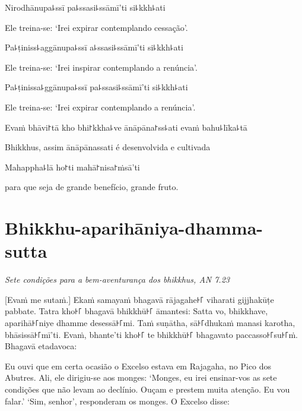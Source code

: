 Nirodhānupa꜕ssī pa꜕ssasi꜕ssāmī'ti si꜕kkh꜕ati

\begin{english}
  Ele treina-se: `Irei expirar contemplando cessação'.
\end{english}

Pa꜕ṭiniss꜕aggānupa꜕ssī a꜕ssasi꜕ssāmī'ti si꜕kkh꜕ati

\begin{english}
  Ele treina-se: `Irei inspirar contemplando a renúncia'.
\end{english}

Pa꜕ṭinissa꜕ggānupa꜕ssī pa꜕ssasi꜕ssāmī'ti si꜕kkh꜕ati

\begin{english}
  Ele treina-se: `Irei expirar contemplando a renúncia'.
\end{english}

Evaṁ bhāvi꜓tā kho bhi꜓kkha꜕ve ānāpāna꜓ss꜕ati evaṁ bahu꜕līka꜕tā

\begin{english}
  Bhikkhus, assim ānāpānassati é desenvolvida e cultivada
\end{english}

Mahappha꜕lā ho꜓ti mahā꜓nisa꜓ṁsā'ti

\begin{english}
  para que seja de grande benefício, grande fruto.
\end{english}


\chapter[Aparihāniya-dhamma-sutta]{Bhikkhu-aparihāniya-dhamma-sutta}

\emph{Sete condições para a bem-aventurança dos bhikkhus, AN 7.23}

\begin{leader}
\end{leader}

[Evaṁ me sutaṁ.] Ekaṁ samayaṁ bhagavā rājagahe꜔꜒ viharati gijjhakūṭe pabbate.
Tatra kho꜔꜒ bhagavā bhikkhū꜔꜒ āmantesi: Satta vo, bhikkhave, aparihā꜔꜒niye dhamme
desessā꜔꜒mi. Taṁ suṇātha, sā꜔꜒dhukaṁ manasi karotha, bhāsissā꜔꜒mī'ti. Evaṁ, bhante'ti
kho꜔꜒ te bhikkhū꜔꜒ bhagavato paccasso꜔꜒su꜔꜒ṁ. Bhagavā etadavoca:

\begin{english}
  Eu ouvi que em certa ocasião o Excelso estava em Rajagaha, no Pico dos
  Abutres. Ali, ele dirigiu-se aos monges: `Monges, eu irei ensinar-vos as sete
  condições que não levam ao declínio. Ouçam e prestem muita atenção. Eu vou
  falar.' `Sim, senhor', responderam os monges. O Excelso disse:
\end{english}


